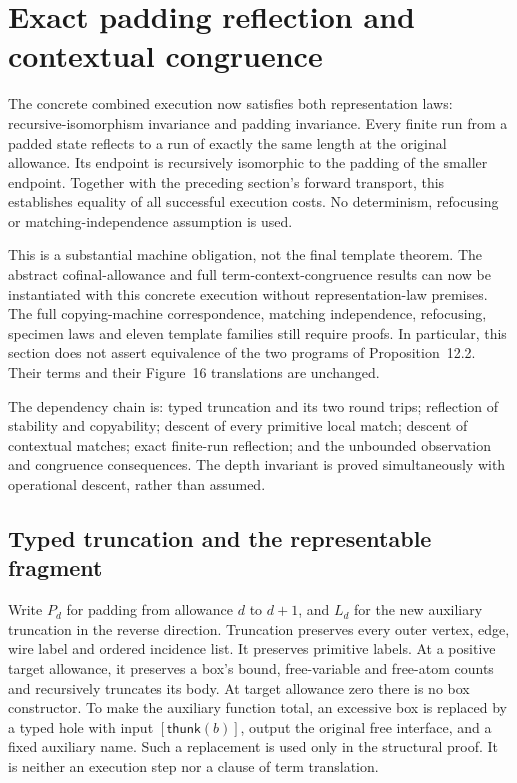 \clearpage
\section{Exact padding reflection and contextual congruence}
\label{sec:copying-padding-reflection}
The concrete combined execution now satisfies both representation laws:
recursive-isomorphism invariance and padding invariance. Every finite run
from a padded state reflects to a run of exactly the same length at the
original allowance. Its endpoint is recursively isomorphic to the padding
of the smaller endpoint. Together with the preceding section's forward
transport, this establishes equality of all successful execution costs.
No determinism, refocusing or matching-independence assumption is used.

This is a substantial machine obligation, not the final template theorem.
The abstract cofinal-allowance and full term-context-congruence results can
now be instantiated with this concrete execution without representation-law
premises. The full copying-machine correspondence, matching independence,
refocusing, specimen laws and eleven template families still require proofs.
In particular, this section does not assert equivalence of the two programs
of Proposition~12.2. Their terms and their Figure~16 translations are unchanged.

The dependency chain is: typed truncation and its two round trips;
reflection of stability and copyability; descent of every primitive local
match; descent of contextual matches; exact finite-run reflection; and the
unbounded observation and congruence consequences. The depth invariant is
proved simultaneously with operational descent, rather than assumed.

\subsection{Typed truncation and the representable fragment}

Write $P_d$ for padding from allowance $d$ to $d+1$, and $L_d$ for the new
auxiliary truncation in the reverse direction. Truncation preserves every
outer vertex, edge, wire label and ordered incidence list. It preserves
primitive labels. At a positive target allowance, it preserves a box's
bound, free-variable and free-atom counts and recursively truncates its body.
At target allowance zero there is no box constructor. To make the auxiliary
function total, an excessive box is replaced by a typed hole with input
$[\mathsf{thunk}(b)]$, output the original free interface, and a fixed
auxiliary name. Such a replacement is used only in the structural proof.
It is neither an execution step nor a clause of term translation.

